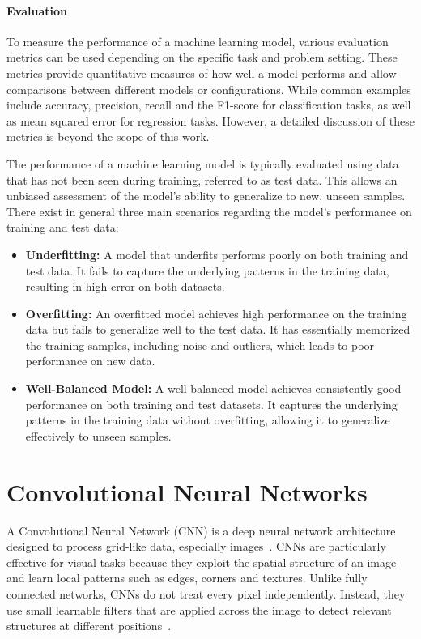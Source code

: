 \paragraph{Evaluation}
To measure the performance of a machine learning model, various evaluation metrics can be used depending on the specific task and problem setting. These metrics provide quantitative measures of how well a model performs and allow comparisons between different models or configurations. While common examples include accuracy, precision, recall and the F1-score for classification tasks, as well as mean squared error for regression tasks. However, a detailed discussion of these metrics is beyond the scope of this work.

The performance of a machine learning model is typically evaluated using data that has not been seen during training, referred to as test data. This allows an unbiased assessment of the model's ability to generalize to new, unseen samples. There exist in general three main scenarios regarding the model's performance on training and test data:
\begin{itemize}
	\item \textbf{Underfitting:} A model that underfits performs poorly on both training and test data. It fails to capture the underlying patterns in the training data, resulting in high error on both datasets.
	\item \textbf{Overfitting:} An overfitted model achieves high performance on the training data but fails to generalize well to the test data. It has essentially memorized the training samples, including noise and outliers, which leads to poor performance on new data.
	\item \textbf{Well-Balanced Model:} A well-balanced model achieves consistently good performance on both training and test datasets. It captures the underlying patterns in the training data without overfitting, allowing it to generalize effectively to unseen samples. 
\end{itemize}






\section{Convolutional Neural Networks}

A Convolutional Neural Network (CNN) is a deep neural network architecture designed to process grid-like data, especially images~\cite{LeCun1998GradientbasedLA, Krizhevsky2012ImageNetCW}. CNNs are particularly effective for visual tasks because they exploit the spatial structure of an image and learn local patterns such as edges, corners and textures. Unlike fully connected networks, CNNs do not treat every pixel independently. Instead, they use small learnable filters that are applied across the image to detect relevant structures at different positions~\cite{Khan2025ACS, Younesi2024ACS, Long2022}.

